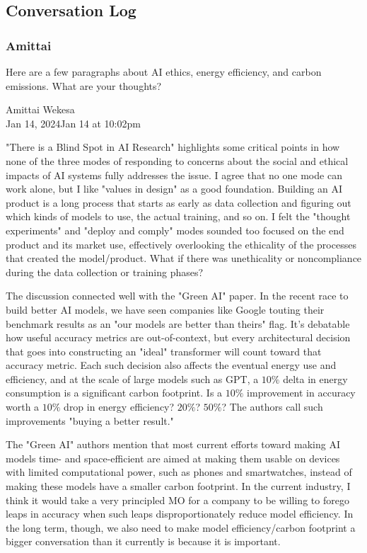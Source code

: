 \subsection{Conversation Log}

\href{https://chat.openai.com/share/53e705d2-b958-4c51-8d43-179f80fa0b92}{}

\subsubsection{Amittai}

Here are a few paragraphs about AI ethics, energy efficiency, and carbon emissions.
What are your thoughts?

Amittai Wekesa \\
Jan 14, 2024Jan 14 at 10:02pm

"There is a Blind Spot in AI Research" highlights some critical points in how
none of the three modes of responding to concerns about the social and ethical
impacts of AI systems fully addresses the issue. I agree that no one mode can
work alone, but I like "values in design" as a good foundation.
Building an AI product is a long process that starts as early as
data collection and figuring out which kinds of models to use,
the actual training, and so on. I felt the "thought experiments"
and "deploy and comply" modes sounded too focused on the end product
and its market use, effectively overlooking the ethicality of the
processes that created the model/product.
What if there was unethicality or noncompliance during the data collection
or training phases?

The discussion connected well with the "Green AI" paper.
In the recent race to build better AI models, we have seen companies
like Google touting their benchmark results as an
"our models are better than theirs" flag.
It's debatable how useful accuracy metrics are out-of-context,
but every architectural decision that goes into constructing an "ideal"
transformer will count toward that accuracy metric.
Each such decision also affects the eventual energy use and efficiency,
and at the scale of large models such as GPT, a $10\%$ delta in energy
consumption is a significant carbon footprint.
Is a $10\%$ improvement in accuracy worth a $10\%$ drop in energy efficiency?
$20\%$? $50\%$? The authors call such improvements "buying a better result."

The "Green AI" authors mention that most current efforts toward making AI
models time- and space-efficient are aimed at making them usable on devices
with limited computational power, such as phones and smartwatches,
instead of making these models have a smaller carbon footprint.
In the current industry, I think it would take a very principled MO
for a company to be willing to forego leaps in accuracy when
such leaps disproportionately reduce model efficiency.
In the long term, though, we also need to make model
efficiency/carbon footprint a bigger conversation than it currently is
because it is important.

